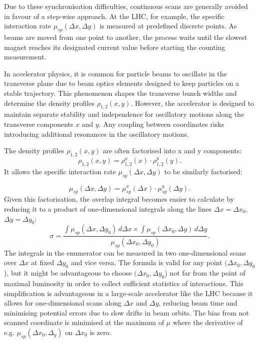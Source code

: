 Due to these synchronisation difficulties, continuous scans are generally avoided in favour of a step-wise approach. At the LHC, for example, the specific interaction rate $\mu_{sp}(\Delta x,\Delta y)$ is measured at predefined discrete points. As beams are moved from one point to another, the process waits until the slowest magnet reaches its designated current value before starting the counting measurement.

In accelerator physics, it is common for particle beams to oscillate in the transverse plane due to beam optics elements designed to keep particles on a stable trajectory. This phenomenon shapes the transverse bunch widths and determine the density profiles $\rho _{1,2}(x, y)$. However, the accelerator is designed to maintain separate stability and independence for oscillatory motions along the transverse components $x$ and $y$. Any coupling between coordinates risks introducing additional resonances in the oscillatory motions.

The density profiles $\rho _{1,2}(x, y)$ are often factorised into x and y components:
\begin{equation}
\rho _{1,2}(x, y) = \rho _{1,2}^x(x) \cdot \rho _{1,2}^y(y).
\end{equation}
It allows the specific interaction rate $\mu_{sp}(\Delta x, \Delta y)$ to be similarly factorised:

\begin{equation}
\mu _{sp}(\Delta x, \Delta y) = \mu ^x_{sp}(\Delta x) \cdot \mu ^y_{sp}(\Delta y).
\end{equation}
Given this factorisation, the overlap integral becomes easier to calculate by reducing it to a product of one-dimensional integrals  along the lines $\Delta x = \Delta x_0$, $\Delta y = \Delta y_0$:
\begin{equation}
\sigma = \frac{\int \mu _{sp}(\Delta x, \Delta y_0)\, d\Delta x \times \int \mu _{sp}(\Delta x_0, \Delta y)\, d\Delta y}{\mu _{sp}(\Delta x_0, \Delta y_0)}.\label{definition_sigma_vdm}
\end{equation}
The integrals in the enumerator can be measured in two one-dimensional scans over $\Delta x$ at fixed $\Delta y_0$ and vice versa. The formula is valid for any point $(\Delta x_0, \Delta y_0$), but it might be advantageous to choose $(\Delta x_0, \Delta y_0$) not far from the point of maximal luminosity in order to collect sufficient statistics of interactions. This simplification is advantageous in a large-scale accelerator like the LHC because it allows for one-dimensional scans along $\Delta x$ and $\Delta y$, reducing beam time and minimising potential errors due to slow drifts in beam orbits. The bias from not scanned coordinate is minimised at the maximum of $\mu$ where the derivative of e.g. $\mu_{sp}(\Delta x_0, \Delta_y)$ on $\Delta x_0$ is zero.

